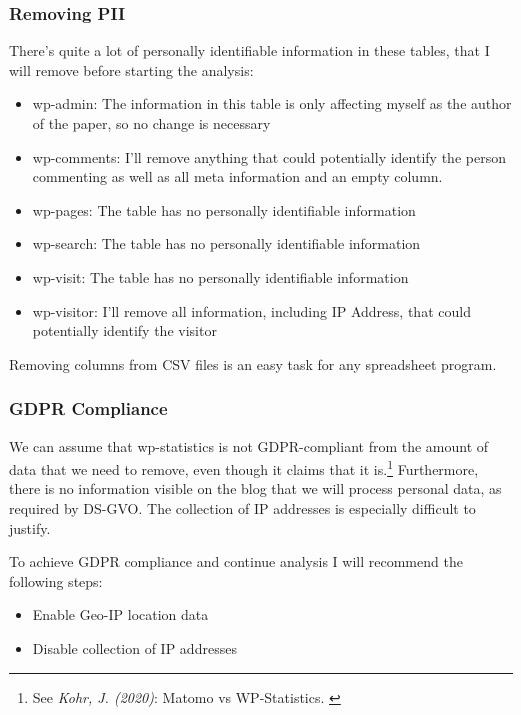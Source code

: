 \subsubsection{Removing PII}

There's quite a lot of personally identifiable information in these tables, that I will remove before starting the analysis:

\begin{itemize}
 \item wp-admin: The information in this table is only affecting myself as the author of the paper, so no change is necessary
 \item wp-comments: I'll remove anything that could potentially identify the person commenting as well as all meta information and an empty column.
 \item wp-pages: The table has no personally identifiable information
 \item wp-search: The table has no personally identifiable information
 \item wp-visit: The table has no personally identifiable information
 \item wp-visitor: I'll remove all information, including IP Address, that could potentially identify the visitor
\end{itemize}

Removing columns from CSV files is an easy task for any spreadsheet program.

\subsubsection{GDPR Compliance}

We can assume that wp-statistics is not GDPR-compliant from the amount of data that we need to remove, even though it claims that it is.\footnote{See \textit{Kohr, J. (2020)}: Matomo vs WP-Statistics. \cite{matomoBlog}} Furthermore, there is no information visible on the blog that we will process personal data, as required by DS-GVO. The collection of IP addresses is especially difficult to justify. 

To achieve GDPR compliance and continue analysis I will recommend the following steps:

\begin{itemize}
 \item Enable Geo-IP location data
 \item Disable collection of IP addresses
\end{itemize}

